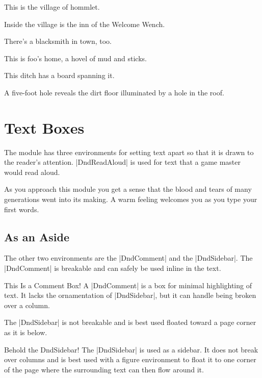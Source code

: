 \documentclass[letterpaper,twocolumn,openany,nodeprecatedcode]{dndbook}
\begin{document}
This is the village of hommlet.

Inside the village is the inn of the Welcome Wench.

There's a blacksmith in town, too.

This is foo's home, a hovel of mud and sticks.

This ditch has a board spanning it.

A five-foot hole reveals the dirt floor illuminated by a hole in the roof.

\chapter{Text Boxes}

The module has three environments for setting text apart so that it is drawn to the reader's attention. |DndReadAloud| is used for text that a game master would read aloud.

\begin{DndReadAloud}
  As you approach this module you get a sense that the blood and tears of many generations went into its making. A warm feeling welcomes you as you type your first words.
\end{DndReadAloud}

\section{As an Aside}
The other two environments are the |DndComment| and the |DndSidebar|. The |DndComment| is breakable and can safely be used inline in the text.

\begin{DndComment}{This Is a Comment Box!}
  A |DndComment| is a box for minimal highlighting of text. It lacks the ornamentation of |DndSidebar|, but it can handle being broken over a column.
\end{DndComment}

The |DndSidebar| is not breakable and is best used floated toward a page corner as it is below.

\begin{DndSidebar}[float=!b]{Behold the DndSidebar!}
  The |DndSidebar| is used as a sidebar. It does not break over columns and is best used with a figure environment to float it to one corner of the page where the surrounding text can then flow around it.
\end{DndSidebar}
\end{document}
